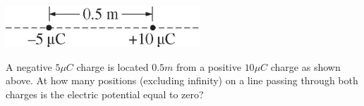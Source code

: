 \begin{center}
\includegraphics[scale=0.5]{images/img-007-018.png}
\end{center}

\begin{questions}\setcounter{question}{22}\question
A negative $5\unit{\mu C}$ charge is located $0.5\unit{m}$ from a positive $10\unit{\mu C}$ charge as shown above. At how many positions (excluding infinity) on a line passing through both charges is the electric potential equal to zero?

\begin{oneparchoices}
\end{oneparchoices}\end{questions}

